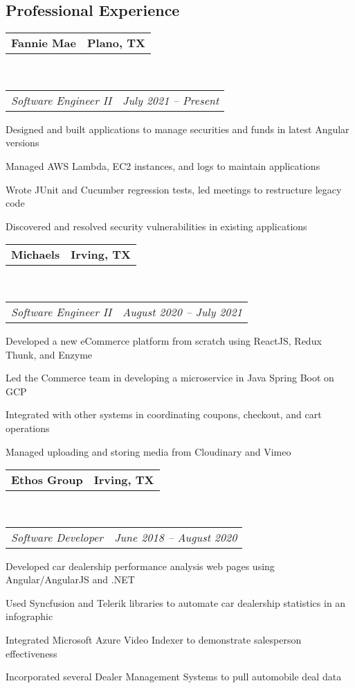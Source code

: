 \documentclass[10pt,letterpaper]{article}
\makeatletter
\newenvironment{indentsection}[1]%
{\begin{list}{}%
	{\setlength{\leftmargin}{#1}}%
	\item[]%
}
{\end{list}}
\newcommand{\headerrow}[2]
{\begin{tabular*}{\linewidth}{l@{\extracolsep{\fill}}r}
	#1 &
	#2 \\
\end{tabular*}}
\makeatother
\begin{document}
\subsection*{Professional Experience}
\begin{indentsection}{\parindent}
	\vspace{-0.4em}
	\headerrow
		{\textbf{Fannie Mae}}
		{\textbf{Plano, TX}}
	\\
	\headerrow
		{\emph{Software Engineer II}}
		{\emph{July 2021 -- Present}}
	\begin{itemize*}
		\item Designed and built applications to manage securities and funds in latest Angular versions
		\item Managed AWS Lambda, EC2 instances, and logs to maintain applications
		\item Wrote JUnit and Cucumber regression tests, led meetings to restructure legacy code 
		\item Discovered and resolved security vulnerabilities in existing applications
	\end{itemize*}
\end{indentsection}
\begin{indentsection}{\parindent}
	\vspace{-0.4em}
	\headerrow
		{\textbf{Michaels}}
		{\textbf{Irving, TX}}
	\\
	\headerrow
		{\emph{Software Engineer II}}
		{\emph{August 2020 -- July 2021}}
	\begin{itemize*}
		\item Developed a new eCommerce platform from scratch using ReactJS, Redux Thunk, and Enzyme
		\item Led the Commerce team in developing a microservice in Java Spring Boot on GCP
		\item Integrated with other systems in coordinating coupons, checkout, and cart operations
		\item Managed uploading and storing media from Cloudinary and Vimeo
	\end{itemize*}
\end{indentsection}
\begin{indentsection}{\parindent}
	\vspace{-0.4em}
	\headerrow
		{\textbf{Ethos Group}}
		{\textbf{Irving, TX}}
	\\
	\headerrow
		{\emph{Software Developer}}
		{\emph{June 2018 -- August 2020}}
	\begin{itemize*}
		\item Developed car dealership performance analysis web pages using Angular/AngularJS and .NET
		\item Used Syncfusion and Telerik libraries to automate car dealership statistics in an infographic
		\item Integrated Microsoft Azure Video Indexer to demonstrate salesperson effectiveness 
		\item Incorporated several Dealer Management Systems to pull automobile deal data
	\end{itemize*}
\end{indentsection}
\end{document}
